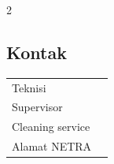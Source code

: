 \documentclass[11pt]{article}
\begin{document}
\begin{multicols}{2}
\subsection*{Kontak}
\renewcommand{\arraystretch}{1.9}
\begin{tabular}{@{}l p{4.2cm}@{}}
Teknisi & \hrulefill \\
Supervisor & \hrulefill \\
Cleaning service & \hrulefill \\
Alamat NETRA & \hrulefill \\
\end{tabular}
\end{multicols}
\end{document}
